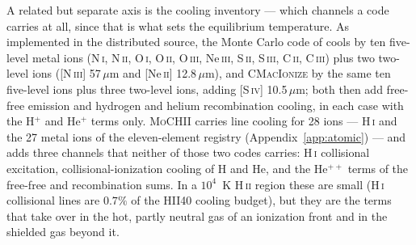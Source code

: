 \documentclass[twocolumn,linenumbers]{aastex702}
\newcommand{\MoCHII}{\textsc{MoCHII}}
\newcommand{\HII}{H\,\textsc{ii}}
\newcommand{\HI}{H\,\textsc{i}}
\begin{document}
A related but separate axis is the cooling inventory --- which channels a
code carries at all, since that is what sets the equilibrium temperature.
As implemented in the distributed source, the Monte Carlo code of
\citet{wood2004} cools by ten five-level metal ions (N\,\textsc{i},
N\,\textsc{ii}, O\,\textsc{i}, O\,\textsc{ii}, O\,\textsc{iii},
Ne\,\textsc{iii}, S\,\textsc{ii}, S\,\textsc{iii}, C\,\textsc{ii},
C\,\textsc{iii}) plus two two-level ions ([N\,\textsc{iii}]
57\,$\mu$m and [Ne\,\textsc{ii}] 12.8\,$\mu$m), and \textsc{CMacIonize} by
the same ten five-level ions plus three two-level ions, adding
[S\,\textsc{iv}] 10.5\,$\mu$m; both then add free-free emission and
hydrogen and helium recombination cooling, in each case with the H$^{+}$
and He$^{+}$ terms only.  \MoCHII{}
carries line cooling for 28 ions --- \HI{} and the 27 metal ions of the
eleven-element registry (Appendix~\ref{app:atomic}) --- and adds three
channels that neither of those two codes carries: \HI{} collisional
excitation, collisional-ionization cooling of H and He, and the He$^{++}$
terms of the free-free and recombination sums.  In a $10^4$~K \HII{}
region these are small (\HI{} collisional lines are $0.7\%$ of the
HII40 cooling budget), but they are the terms that take over in the hot,
partly neutral gas of an ionization front and in the shielded gas beyond
it.
\end{document}
